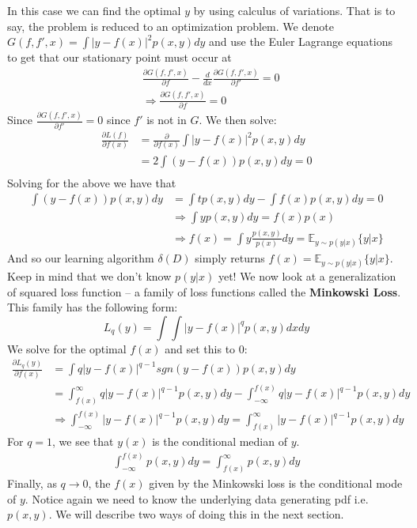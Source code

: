 \documentclass[]{article}
\theoremstyle{mattstyle}
\theoremstyle{definition}
\begin{document}
In this case we can find the optimal $y$ by using calculus of variations. That is to say, the problem is reduced to an optimization problem. We denote $G(f, f', x) = \int | y - f(x) |^2 p(x, y) dy$ and use the Euler Lagrange equations to get that our stationary point must occur at 
\begin{align*}
&\frac{\partial G(f, f', x)}{\partial f} - \frac{d}{dx}\frac{\partial G(f, f', x)}{\partial f'} = 0\\
&\Rightarrow \frac{\partial G(f, f', x)}{\partial f}=0
\end{align*}
Since $\frac{\partial G(f, f', x)}{\partial f'}=0$ since $f'$ is not in $G$. We then solve:
\begin{align*}
\frac{\partial L(f)}{\partial f(x)} &= \frac{\partial}{\partial f(x)}\int | y - f(x) |^2 p(x, y) dy\\
&=2 \int (y - f(x)) p(x, y) dy = 0\\
\end{align*}
Solving for the above we have that
\begin{align*}
\int (y - f(x)) p(x, y) dy &= \int t p(x, y) dy - \int f(x) p(x, y) dy = 0\\
&\Rightarrow \int y p(x, y) dy =  f(x)p(x) \\
&\Rightarrow f(x) = \int y \frac{p(x, y)}{p(x)} dy = \mathbb{E}_{y \sim p(y|x)}\{y|x\}
\end{align*}
And so our learning algorithm $\delta(D)$ simply returns $f(x) = \mathbb{E}_{y \sim p(y|x)}\{y|x\}$. Keep in mind that we don't know $p(y|x)$ yet! We now look at a generalization of squared loss function -- a family of loss functions called the \textbf{Minkowski Loss}. This family has the following form:
\begin{equation}
L_q(y) = \int\int |y-f(x)|^q p(x,y)dxdy
\end{equation}
We solve for the optimal $f(x)$ and set this to 0:
\begin{align}
\frac{\partial L_q(y)}{\partial f(x)} &= \int q|y-f(x)|^{q-1} sgn(y-f(x)) p(x,y)dy\\
&= \int_{f(x)}^{\infty} q|y-f(x)|^{q-1}p(x,y)dy-\int_{-\infty}^{f(x)} q|y-f(x)|^{q-1}p(x,y)dy\\
&\Rightarrow \int_{-\infty}^{f(x)} |y-f(x)|^{q-1}p(x,y)dy = \int_{f(x)}^{\infty} |y-f(x)|^{q-1}p(x,y)dy
\end{align}
For $q=1$, we see that $y(x)$ is the conditional median of $y$.
\begin{align}
\int_{-\infty}^{f(x)} p(x,y)dy = \int_{f(x)}^{\infty} p(x,y)dy
\end{align}
Finally, as $q \rightarrow 0$, the $f(x)$ given by the Minkowski loss is the conditional mode of $y$. Notice again we need to know the underlying data generating pdf i.e. $p(x, y)$. We will describe two ways of doing this in the next section.
\end{document}
